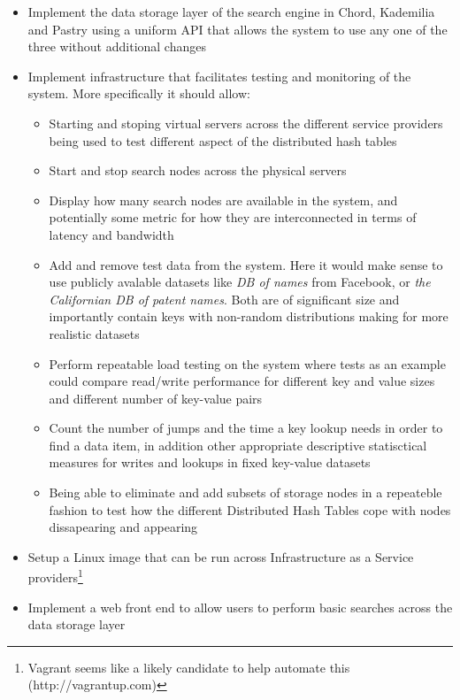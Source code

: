\begin{itemize}
  \item Implement the data storage layer of the search engine in Chord, Kademilia and Pastry using a uniform API that allows the system to use any one of the three without additional changes
  
  \item Implement infrastructure that facilitates testing and monitoring of the system. More specifically it should allow:

  \begin{itemize}
    \item Starting and stoping virtual servers across the different service providers being used to test different aspect of the distributed hash tables
    \item Start and stop search nodes across the physical servers
    \item Display how many search nodes are available in the system, and potentially some metric for how they are interconnected in terms of latency and bandwidth
    \item Add and remove test data from the system. Here it would make sense to use publicly avalable datasets like \emph{DB of names} from Facebook, or \emph{the Californian DB of patent names}. Both are of significant size and importantly contain keys with non-random distributions making for more realistic datasets
    \item Perform repeatable load testing on the system where tests as an example could compare read/write performance for different key and value sizes and different number of key-value pairs
    \item Count the number of jumps and the time a key lookup needs in order to find a data item, in addition other appropriate descriptive statisctical measures for writes and lookups in fixed key-value datasets
    \item Being able to eliminate and add subsets of storage nodes in a repeateble fashion to test how the different Distributed Hash Tables cope with nodes dissapearing and appearing
  \end{itemize}

  \item Setup a Linux image that can be run across Infrastructure as a Service providers\footnote{Vagrant seems like a likely candidate to help automate this (http://vagrantup.com)}

  \item Implement a web front end to allow users to perform basic searches across the data storage layer

\end{itemize}

